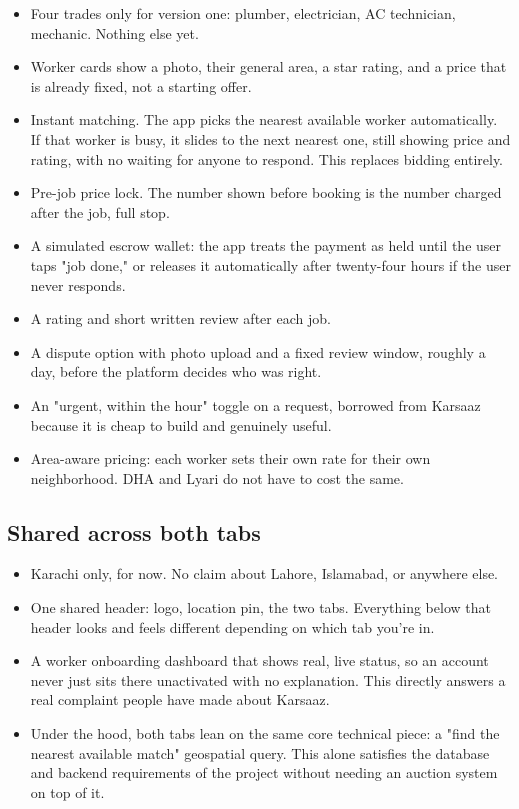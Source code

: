 \documentclass[11pt,a4paper]{article}
\begin{document}
\begin{itemize}
  \item Four trades only for version one: plumber, electrician, AC technician, mechanic. Nothing else yet.
  \item Worker cards show a photo, their general area, a star rating, and a price that is already fixed, not a starting offer.
  \item Instant matching. The app picks the nearest available worker automatically. If that worker is busy, it slides to the next nearest one, still showing price and rating, with no waiting for anyone to respond. This replaces bidding entirely.
  \item Pre-job price lock. The number shown before booking is the number charged after the job, full stop.
  \item A simulated escrow wallet: the app treats the payment as held until the user taps "job done," or releases it automatically after twenty-four hours if the user never responds.
  \item A rating and short written review after each job.
  \item A dispute option with photo upload and a fixed review window, roughly a day, before the platform decides who was right.
  \item An "urgent, within the hour" toggle on a request, borrowed from Karsaaz because it is cheap to build and genuinely useful.
  \item Area-aware pricing: each worker sets their own rate for their own neighborhood. DHA and Lyari do not have to cost the same.
\end{itemize}

\subsection{Shared across both tabs}

\begin{itemize}
  \item Karachi only, for now. No claim about Lahore, Islamabad, or anywhere else.
  \item One shared header: logo, location pin, the two tabs. Everything below that header looks and feels different depending on which tab you're in.
  \item A worker onboarding dashboard that shows real, live status, so an account never just sits there unactivated with no explanation. This directly answers a real complaint people have made about Karsaaz.
  \item Under the hood, both tabs lean on the same core technical piece: a "find the nearest available match" geospatial query. This alone satisfies the database and backend requirements of the project without needing an auction system on top of it.
\end{itemize}
\end{document}

